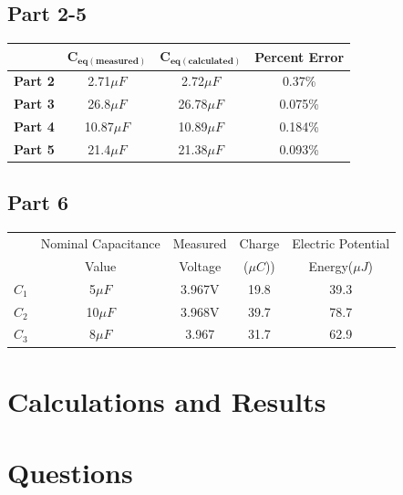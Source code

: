 \documentclass[titlepage]{article}
\begin{document}
	    \subsection{Part 2-5} 
		\begin{table}[hbt!]
			\centering
			\begin{tabular}{c|c|c|c}
				& $\bm{C_{eq(measured)}}$ & $\bm{C_{eq(calculated)}}$ & \textbf{Percent Error} \\
				\hline
				\textbf{Part 2} &2.71$\mu F$ &2.72$\mu F$ &0.37\% \\
				\textbf{Part 3} &26.8$\mu F$ &26.78$\mu F$ &0.075\% \\
				\textbf{Part 4} &10.87$\mu F$ &10.89$\mu F$ &0.184\% \\
				\textbf{Part 5} &21.4$\mu F$ &21.38$\mu F$ &0.093\% 
			\end{tabular}
		\end{table}

	    \subsection{Part 6}
        \FloatBarrier
		\begin{table}[hbt!]
			\centering
			\begin{tabular}{c|c|c|c|c}
				& Nominal Capacitance & Measured & Charge & Electric Potential\\
				& Value & Voltage &($\mu C$)) & Energy($\mu J$)\\
				\hline
			$C_1$ & 5$\mu F$ & 3.967V& 19.8 & 39.3 \\ 
			$C_2$ & 10$\mu F$ & 3.968V& 39.7 & 78.7 \\ 
			$C_3$ & 8$\mu F$ & 3.967& 31.7 & 62.9\\ 

			\end{tabular}
	   	\end{table} 
        \FloatBarrier



    \section{Calculations and Results}



	\section{Questions}
\end{document}
